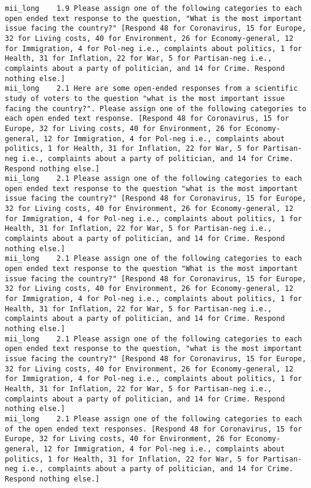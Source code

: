 \begin{lstlisting}[label=lst:promptvariants]
mii_long	1.9	Please assign one of the following categories to each open ended text response to the question, "What is the most important issue facing the country?" [Respond 48 for Coronavirus, 15 for Europe, 32 for Living costs, 40 for Environment, 26 for Economy-general, 12 for Immigration, 4 for Pol-neg i.e., complaints about politics, 1 for Health, 31 for Inflation, 22 for War, 5 for Partisan-neg i.e., complaints about a party of politician, and 14 for Crime. Respond nothing else.]
mii_long	2.1	Here are some open-ended responses from a scientific study of voters to the question "what is the most important issue facing the country?". Please assign one of the following categories to each open ended text response. [Respond 48 for Coronavirus, 15 for Europe, 32 for Living costs, 40 for Environment, 26 for Economy-general, 12 for Immigration, 4 for Pol-neg i.e., complaints about politics, 1 for Health, 31 for Inflation, 22 for War, 5 for Partisan-neg i.e., complaints about a party of politician, and 14 for Crime. Respond nothing else.]
mii_long	2.1	Please assign one of the following categories to each open ended text response to the question "what is the most important issue facing the country?" [Respond 48 for Coronavirus, 15 for Europe, 32 for Living costs, 40 for Environment, 26 for Economy-general, 12 for Immigration, 4 for Pol-neg i.e., complaints about politics, 1 for Health, 31 for Inflation, 22 for War, 5 for Partisan-neg i.e., complaints about a party of politician, and 14 for Crime. Respond nothing else.]
mii_long	2.1	Please assign one of the following categories to each open ended text response to the question "What is the most important issue facing the country?" [Respond 48 for Coronavirus, 15 for Europe, 32 for Living costs, 40 for Environment, 26 for Economy-general, 12 for Immigration, 4 for Pol-neg i.e., complaints about politics, 1 for Health, 31 for Inflation, 22 for War, 5 for Partisan-neg i.e., complaints about a party of politician, and 14 for Crime. Respond nothing else.]
mii_long	2.1	Please assign one of the following categories to each open ended text response to the question, "what is the most important issue facing the country?" [Respond 48 for Coronavirus, 15 for Europe, 32 for Living costs, 40 for Environment, 26 for Economy-general, 12 for Immigration, 4 for Pol-neg i.e., complaints about politics, 1 for Health, 31 for Inflation, 22 for War, 5 for Partisan-neg i.e., complaints about a party of politician, and 14 for Crime. Respond nothing else.]
mii_long	2.1	Please assign one of the following categories to each of the open ended text responses. [Respond 48 for Coronavirus, 15 for Europe, 32 for Living costs, 40 for Environment, 26 for Economy-general, 12 for Immigration, 4 for Pol-neg i.e., complaints about politics, 1 for Health, 31 for Inflation, 22 for War, 5 for Partisan-neg i.e., complaints about a party of politician, and 14 for Crime. Respond nothing else.]

\end{lstlisting}
